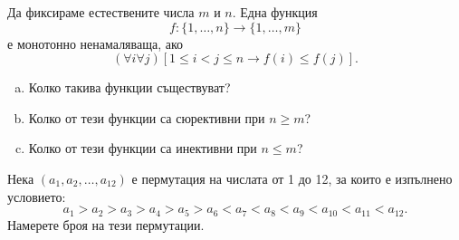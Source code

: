 \begin{problem}
  Да фиксираме естествените числа $m$ и $n$.
  Една функция \[f:\{1,\dots,n\}\to\{1,\dots,m\}\] е монотонно ненамаляваща, ако
  \[(\forall i\forall j)[1\leq i<j\leq n \rightarrow f(i)\leq f(j)].\]
  \begin{enumerate}[a)]
  \item
    Колко такива функции съществуват?
  \item
    Колко от тези функции са сюрективни при $n\geq m$?
  \item
    Колко от тези функции са инективни при $n\leq m$?
\end{enumerate}
\end{problem}


\begin{problem}
  Нека $(a_1,a_2,\dots,a_{12})$ е пермутация на числата от 1 до 12, за които е изпълнено условието:
  \[a_1 > a_2 > a_3 > a_4 > a_5 > a_6 < a_7 < a_8 < a_9 < a_{10} < a_{11} < a_{12}.\]
  Намерете броя на тези пермутации.  
\end{problem}





